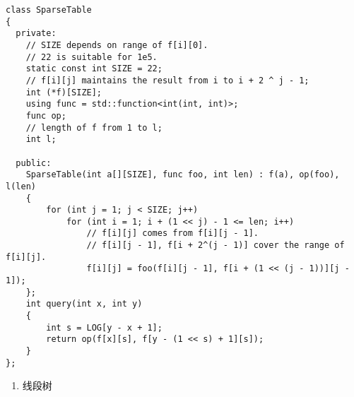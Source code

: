\documentclass[]{article}
\providecommand{\tightlist}{%
  \setlength{\itemsep}{0pt}\setlength{\parskip}{0pt}}
\begin{document}
\begin{verbatim}
class SparseTable
{
  private:
    // SIZE depends on range of f[i][0].
    // 22 is suitable for 1e5.
    static const int SIZE = 22;
    // f[i][j] maintains the result from i to i + 2 ^ j - 1;
    int (*f)[SIZE];
    using func = std::function<int(int, int)>;
    func op;
    // length of f from 1 to l;
    int l;

  public:
    SparseTable(int a[][SIZE], func foo, int len) : f(a), op(foo), l(len)
    {
        for (int j = 1; j < SIZE; j++)
            for (int i = 1; i + (1 << j) - 1 <= len; i++)
                // f[i][j] comes from f[i][j - 1].
                // f[i][j - 1], f[i + 2^(j - 1)] cover the range of f[i][j].
                f[i][j] = foo(f[i][j - 1], f[i + (1 << (j - 1))][j - 1]);
    };
    int query(int x, int y)
    {
        int s = LOG[y - x + 1];
        return op(f[x][s], f[y - (1 << s) + 1][s]);
    }
};
\end{verbatim}

\begin{enumerate}
\def\labelenumi{\arabic{enumi}.}
\setcounter{enumi}{3}
\tightlist
\item
  线段树
\end{enumerate}
\end{document}
